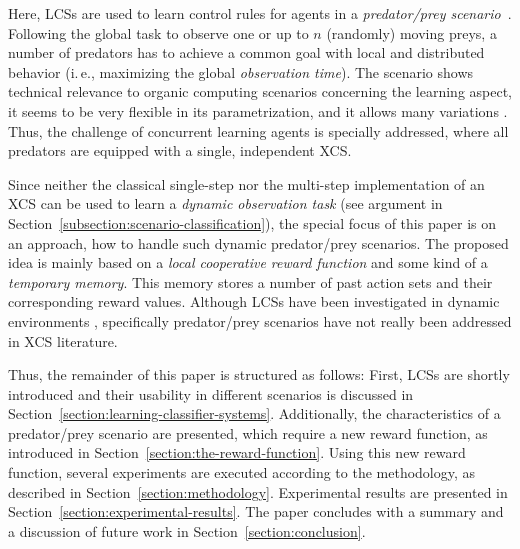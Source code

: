 \documentclass{sig-alternate}
\begin{document}
Here, LCSs are used to learn control rules for agents in a \emph{predator/prey scenario}~\cite{BJD86}. Following the global task to observe one or up to $n$ (randomly) moving preys, a number of predators has %
to achieve a common goal with local and distributed behavior (i.\,e., maximizing the global \emph{observation time}). The scenario shows technical relevance to organic computing scenarios concerning the learning aspect, it seems to be very flexible in its parametrization, and it allows many variations \cite{SV00}.
Thus, the challenge of concurrent learning agents is specially addressed, where all predators are equipped with a single, independent XCS.

Since neither the classical single-step nor the multi-step implementation of an XCS \cite{BW02} can be used to learn a \emph{dynamic observation task} %
(see argument in Section~\ref{subsection:scenario-classification}), the special focus of this paper is on an approach, how to handle such dynamic predator/prey scenarios. The proposed idea is mainly based on a \emph{local cooperative reward function} and some kind of a \emph{temporary memory}. This memory stores a number of past action sets and their corresponding reward values. 
Although LCSs have been investigated in dynamic environments \cite{Lan98,LW00}, specifically predator/prey scenarios have not really been addressed in XCS literature. %


Thus, the remainder of this paper is structured as follows: First, LCSs are shortly introduced and their usability in different scenarios is discussed in Section~\ref{section:learning-classifier-systems}. 
Additionally, the characteristics of a predator/prey scenario are presented, which require a new reward function, as introduced in Section~\ref{section:the-reward-function}. Using this new reward function, several experiments are executed according to the methodology, as described in Section~\ref{section:methodology}. Experimental results are presented in Section~\ref{section:experimental-results}. The paper concludes with a summary and a discussion of future work in Section~\ref{section:conclusion}. %
\end{document}

